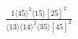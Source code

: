 \documentclass[varwidth, border=5pt]{standalone}
\begin{document}
\begin{my}
$\begin{gathered}
\scriptscriptstyle\frac{1⟨45⟩^2⟨15⟩[25]^2}{⟨13⟩⟨14⟩^2⟨35⟩[45]^2}
\end{gathered}$
\end{my}
\end{document}
